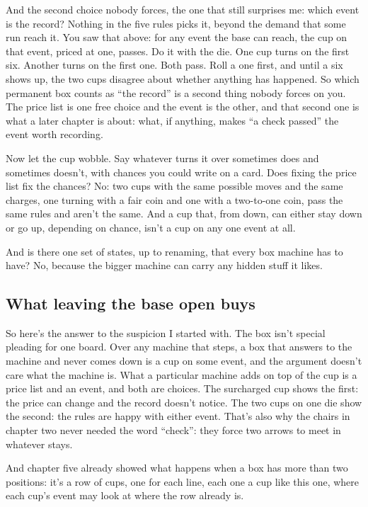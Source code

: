 \documentclass[11pt,twoside]{article}
\theoremstyle{thielethm}
\theoremstyle{thieledef}
\theoremstyle{thieledef}
\theoremstyle{thieledef}
\theoremstyle{thielethm}
\theoremstyle{thieleobs}
\theoremstyle{thielethm}
\begin{document}
And the second choice nobody forces, the one that still surprises me: which event is the record? Nothing in the five rules picks it, beyond the demand that some run reach it. You saw that above: for any event the base can reach, the cup on that event, priced at one, passes. Do it with the die. One cup turns on the first six. Another turns on the first one. Both pass. Roll a one first, and until a six shows up, the two cups disagree about whether anything has happened. So which permanent box counts as ``the record'' is a second thing nobody forces on you. The price list is one free choice and the event is the other, and that second one is what a later chapter is about: what, if anything, makes ``a check passed'' the event worth recording.

Now let the cup wobble. Say whatever turns it over sometimes does and sometimes doesn't, with chances you could write on a card. Does fixing the price list fix the chances? No: two cups with the same possible moves and the same charges, one turning with a fair coin and one with a two-to-one coin, pass the same rules and aren't the same. And a cup that, from down, can either stay down or go up, depending on chance, isn't a cup on any one event at all.

And is there one set of states, up to renaming, that every box machine has to have? No, because the bigger machine can carry any hidden stuff it likes.

\subsection{What leaving the base open buys}

So here's the answer to the suspicion I started with. The box isn't special pleading for one board. Over any machine that steps, a box that answers to the machine and never comes down is a cup on some event, and the argument doesn't care what the machine is. What a particular machine adds on top of the cup is a price list and an event, and both are choices. The surcharged cup shows the first: the price can change and the record doesn't notice. The two cups on one die show the second: the rules are happy with either event. That's also why the chairs in chapter two never needed the word ``check'': they force two arrows to meet in whatever stays.

And chapter five already showed what happens when a box has more than two positions: it's a row of cups, one for each line, each one a cup like this one, where each cup's event may look at where the row already is.
\end{document}

